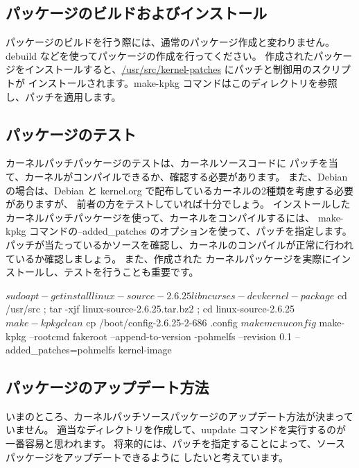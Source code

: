 \documentclass[mingoth,a4paper]{jsarticle}
\begin{document}
\subsection{パッケージのビルドおよびインストール}
パッケージのビルドを行う際には、通常のパッケージ作成と変わりません。
debuild などを使ってパッケージの作成を行ってください。
作成されたパッケージをインストールすると、\url{/usr/src/kernel-patches} にパッチと制御用のスクリプトが
インストールされます。make-kpkg コマンドはこのディレクトリを参照し、パッチを適用します。
\begin{commandline}
\end{commandline}

\subsection{パッケージのテスト}
カーネルパッチパッケージのテストは、カーネルソースコードに
パッチを当て、カーネルがコンパイルできるか、確認する必要があります。
また、Debian の場合は、Debian と kernel.org で配布しているカーネルの2種類を考慮する必要がありますが、
前者の方をテストしていれば十分でしょう。
インストールしたカーネルパッチパッケージを使って、カーネルをコンパイルするには、
make-kpkg コマンドの--added\_patches のオプションを使って、パッチを指定します。
パッチが当たっているかソースを確認し、カーネルのコンパイルが正常に行われているか確認しましょう。
また、作成された カーネルパッケージを実際にインストールし、テストを行うことも重要です。

\begin{commandline}
$ sudo apt-get install linux-source-2.6.25 libncurses-dev kernel-package
$ cd /usr/src ; tar -xjf linux-source-2.6.25.tar.bz2 ; cd linux-source-2.6.25
$ make-kpkg clean
$ cp /boot/config-2.6.25-2-686 .config
$ make menuconfig
$ make-kpkg --rootcmd fakeroot --append-to-version -pohmelfs --revision 0.1 --added_patches=pohmelfs kernel-image
\end{commandline}

\subsection{パッケージのアップデート方法}
いまのところ、カーネルパッチソースパッケージのアップデート方法が決まっていません。
適当なディレクトリを作成して、uupdate コマンドを実行するのが一番容易と思われます。
将来的には、パッチを指定することによって、ソースパッケージをアップデートできるように
したいと考えています。
\end{document}
